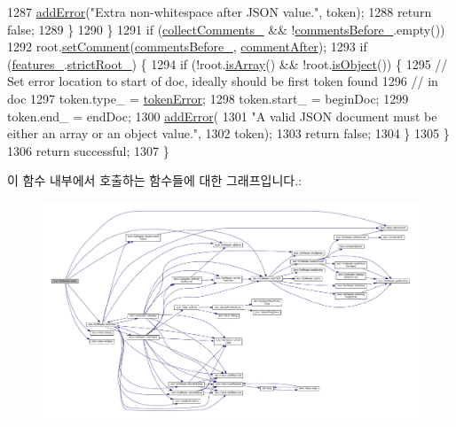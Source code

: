 \begin{DoxyCode}
1287       \hyperlink{class_json_1_1_our_reader_aa6a920311e6408ff3a45324d49da18a6}{addError}(\textcolor{stringliteral}{"Extra non-whitespace after JSON value."}, token);
1288       \textcolor{keywordflow}{return} \textcolor{keyword}{false};
1289     \}
1290   \}
1291   \textcolor{keywordflow}{if} (\hyperlink{class_json_1_1_our_reader_a259f6ac988da2894bcafc670e42f73ad}{collectComments\_} && !\hyperlink{class_json_1_1_our_reader_a9c53e77e290eb9081298210a955fda6a}{commentsBefore\_}.empty())
1292     root.\hyperlink{class_json_1_1_value_a29f3a30f7e5d3af6f38d57999bf5b480}{setComment}(\hyperlink{class_json_1_1_our_reader_a9c53e77e290eb9081298210a955fda6a}{commentsBefore\_}, \hyperlink{namespace_json_a4fc417c23905b2ae9e2c47d197a45351ac5784ca53b12250888ddb642b06aebef}{commentAfter});
1293   \textcolor{keywordflow}{if} (\hyperlink{class_json_1_1_our_reader_a2714302d5cc54ca2ce4118ea51c0397a}{features\_}.\hyperlink{class_json_1_1_our_features_a2095f66a776c0a4ae6cc931a0c94242e}{strictRoot\_}) \{
1294     \textcolor{keywordflow}{if} (!root.\hyperlink{class_json_1_1_value_a1627eb9d6568d6d0252fa8bb711c0a59}{isArray}() && !root.\hyperlink{class_json_1_1_value_a8cf96c0f2a552051fcfc78ffee60e037}{isObject}()) \{
1295       \textcolor{comment}{// Set error location to start of doc, ideally should be first token found}
1296       \textcolor{comment}{// in doc}
1297       token.type\_ = \hyperlink{class_json_1_1_our_reader_a15116f7276ddf1e7a2cc3cbefa884dccad39f929b971de8dc55fe84a2d2e3465e}{tokenError};
1298       token.start\_ = beginDoc;
1299       token.end\_ = endDoc;
1300       \hyperlink{class_json_1_1_our_reader_aa6a920311e6408ff3a45324d49da18a6}{addError}(
1301           \textcolor{stringliteral}{"A valid JSON document must be either an array or an object value."},
1302           token);
1303       \textcolor{keywordflow}{return} \textcolor{keyword}{false};
1304     \}
1305   \}
1306   \textcolor{keywordflow}{return} successful;
1307 \}
\end{DoxyCode}
이 함수 내부에서 호출하는 함수들에 대한 그래프입니다.\+:\nopagebreak
\begin{figure}[H]
\begin{center}
\leavevmode
\includegraphics[width=350pt]{class_json_1_1_our_reader_aba4f8749aab7f02ec17f107e392caf80_cgraph}
\end{center}
\end{figure}
